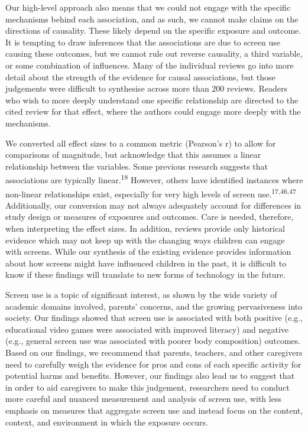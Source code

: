 \documentclass[
  english,
  man]{apa6}
\begin{document}
Our high-level approach also means that we could not engage with the specific mechanisms behind each association, and as such, we cannot make claims on the directions of causality.
These likely depend on the specific exposure and outcome.
It is tempting to draw inferences that the associations are due to screen use causing these outcomes, but we cannot rule out reverse causality, a third variable, or some combination of influences.
Many of the individual reviews go into more detail about the strength of the evidence for causal associations, but those judgements were difficult to synthesise across more than 200 reviews.
Readers who wish to more deeply understand one specific relationship are directed to the cited review for that effect, where the authors could engage more deeply with the mechanisms.

We converted all effect sizes to a common metric (Pearson's r) to allow for comparisons of magnitude, but acknowledge that this assumes a linear relationship between the variables.
Some previous research suggests that associations are typically linear.\textsuperscript{18}
However, others have identified instances where non-linear relationships exist, especially for very high levels of screen use.\textsuperscript{17,46,47}
Additionally, our conversion may not always adequately account for differences in study design or measures of exposures and outcomes.
Care is needed, therefore, when interpreting the effect sizes.
In addition, reviews provide only historical evidence which may not keep up with the changing ways children can engage with screens.
While our synthesis of the existing evidence provides information about how screens might have influenced children in the past, it is difficult to know if these findings will translate to new forms of technology in the future.

Screen use is a topic of significant interest, as shown by the wide variety of academic domains involved, parents' concerns, and the growing pervasiveness into society.
Our findings showed that screen use is associated with both positive (e.g., educational video games were associated with improved literacy) and negative (e.g., general screen use was associated with poorer body composition) outcomes.
Based on our findings, we recommend that parents, teachers, and other caregivers need to carefully weigh the evidence for pros and cons of each specific activity for potential harms and benefits.
However, our findings also lead us to suggest that in order to aid caregivers to make this judgement, researchers need to conduct more careful and nuanced measurement and analysis of screen use, with less emphasis on measures that aggregate screen use and instead focus on the content, context, and environment in which the exposure occurs.
\end{document}
